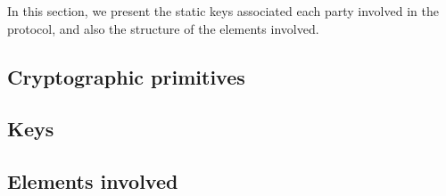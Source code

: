 
In this section, we present the static keys associated each party involved in the protocol, and also the structure of the elements involved.



\subsection{Cryptographic primitives}
\label{sec:bb:crypto-primitives}
%


\subsection{Keys}
\label{sec:bb:keys}


\subsection{Elements involved}
\label{sec:bb:elements}

